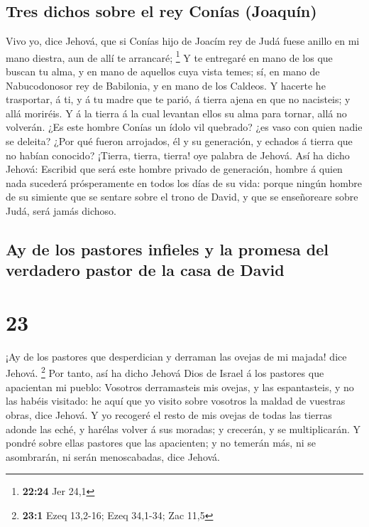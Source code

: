 \hypertarget{tres-dichos-sobre-el-rey-conuxedas-joaquuxedn}{%
\subsection{Tres dichos sobre el rey Conías
(Joaquín)}\label{tres-dichos-sobre-el-rey-conuxedas-joaquuxedn}}

 Vivo yo, dice Jehová, que si Conías hijo de Joacím rey
de Judá fuese anillo en mi mano diestra, aun de allí te arrancaré;
\footnote{\textbf{22:24} Jer 24,1}  Y te entregaré en
mano de los que buscan tu alma, y en mano de aquellos cuya vista temes;
sí, en mano de Nabucodonosor rey de Babilonia, y en mano de los Caldeos.
 Y hacerte he trasportar, á ti, y á tu madre que te
parió, á tierra ajena en que no nacisteis; y allá moriréis.
 Y á la tierra á la cual levantan ellos su alma para
tornar, allá no volverán.  ¿Es este hombre Conías un
ídolo vil quebrado? ¿es vaso con quien nadie se deleita? ¿Por qué fueron
arrojados, él y su generación, y echados á tierra que no habían
conocido?  ¡Tierra, tierra, tierra! oye palabra de
Jehová.  Así ha dicho Jehová: Escribid que será este
hombre privado de generación, hombre á quien nada sucederá prósperamente
en todos los días de su vida: porque ningún hombre de su simiente que se
sentare sobre el trono de David, y que se enseñoreare sobre Judá, será
jamás dichoso.

\hypertarget{ay-de-los-pastores-infieles-y-la-promesa-del-verdadero-pastor-de-la-casa-de-david}{%
\subsection{Ay de los pastores infieles y la promesa del verdadero
pastor de la casa de
David}\label{ay-de-los-pastores-infieles-y-la-promesa-del-verdadero-pastor-de-la-casa-de-david}}

\hypertarget{section-22}{%
\section{23}\label{section-22}}

 ¡Ay de los pastores que desperdician y derraman las
ovejas de mi majada! dice Jehová. \footnote{\textbf{23:1} Ezeq 13,2-16;
  Ezeq 34,1-34; Zac 11,5}  Por tanto, así ha dicho Jehová
Dios de Israel á los pastores que apacientan mi pueblo: Vosotros
derramasteis mis ovejas, y las espantasteis, y no las habéis visitado:
he aquí que yo visito sobre vosotros la maldad de vuestras obras, dice
Jehová.  Y yo recogeré el resto de mis ovejas de todas las
tierras adonde las eché, y harélas volver á sus moradas; y crecerán, y
se multiplicarán.  Y pondré sobre ellas pastores que las
apacienten; y no temerán más, ni se asombrarán, ni serán menoscabadas,
dice Jehová.

